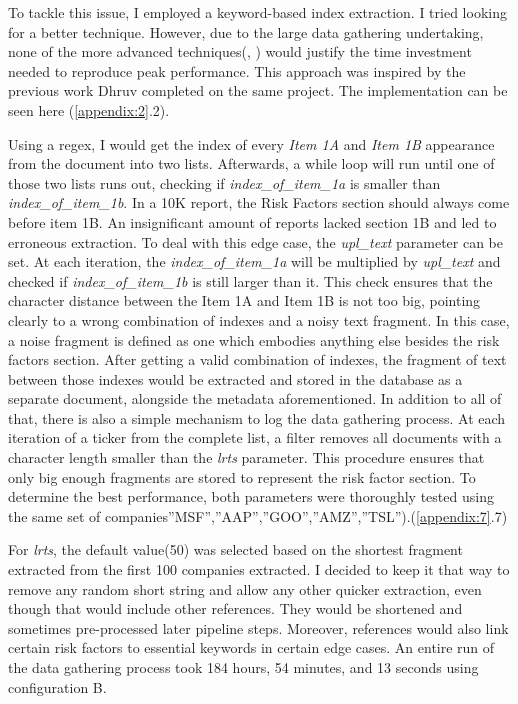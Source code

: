 \documentclass[12pt,MSc,a4paper,oneside]{muthesis}
\begin{document}
  To tackle this issue, I employed a keyword-based index extraction. I tried looking for a better technique. However, due to the large data gathering undertaking, none of the more advanced techniques(\cite{SOUILI2015635},  \cite{clarity-nlp}) would justify the time investment needed to reproduce peak performance. This approach was inspired by the previous work Dhruv completed on the same project\cite{dhruv}. The implementation can be seen here (\ref{appendix:2}.2).

  Using a regex, I would get the index of every \textit{Item 1A} and \textit{Item  1B} appearance from the document into two lists. Afterwards, a while loop will run until one of those two lists runs out, checking if \textit{index\_of\_item\_1a} is smaller than \textit{index\_of\_item\_1b}. In a 10K report, the Risk Factors section should always come before item 1B. An insignificant amount of reports lacked section 1B and led to erroneous extraction. To deal with this edge case, the\textit{ upl\_text} parameter can be set.
  At each iteration, the \textit{index\_of\_item\_1a} will be multiplied by \textit{upl\_text }and checked if \textit{index\_of\_item\_1b} is still larger than it. This check ensures that the character distance between the Item 1A and Item 1B is not too big, pointing clearly to a wrong combination of indexes and a noisy text fragment. In this case, a noise fragment is defined as one which embodies anything else besides the risk factors section. After getting a valid combination of indexes, the fragment of text between those indexes would be extracted and stored in the database as a separate document, alongside the metadata aforementioned.
  In addition to all of that, there is also a simple mechanism to log the data gathering process. At each iteration of a ticker from the complete list, a filter removes all documents with a character length smaller than the \textit{lrts} parameter. This procedure ensures that only big enough fragments are stored to represent the risk factor section.
To determine the best performance, both parameters were thoroughly tested using the same set of companies''MSF'',''AAP'',''GOO'',''AMZ'',''TSL'').(\ref{appendix:7}.7)

For \textit{lrts}, the default value(50) was selected based on the shortest fragment extracted from the first 100 companies extracted. I decided to keep it that way to remove any random short string and allow any other quicker extraction, even though that would include other references. They would be shortened and sometimes pre-processed later pipeline steps. Moreover, references would also link certain risk factors to essential keywords in certain edge cases.
An entire run of the data gathering process took 184 hours, 54 minutes, and 13 seconds using configuration B.
\end{document}
